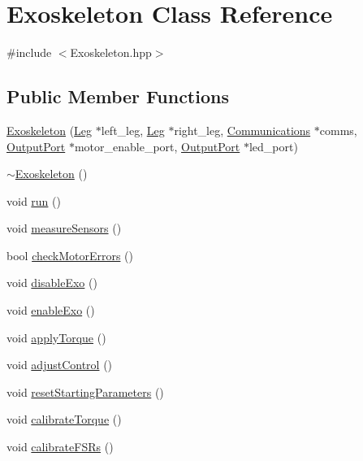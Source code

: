 \hypertarget{classExoskeleton}{}\section{Exoskeleton Class Reference}
\label{classExoskeleton}


{\ttfamily \#include $<$Exoskeleton.\+hpp$>$}

\subsection*{Public Member Functions}
\begin{DoxyCompactItemize}
\item 
\hyperlink{classExoskeleton_ad8715617b3ba37cb31cbfa9679ec658f}{Exoskeleton} (\hyperlink{classLeg}{Leg} $\ast$left\+\_\+leg, \hyperlink{classLeg}{Leg} $\ast$right\+\_\+leg, \hyperlink{classCommunications}{Communications} $\ast$comms, \hyperlink{classOutputPort}{Output\+Port} $\ast$motor\+\_\+enable\+\_\+port, \hyperlink{classOutputPort}{Output\+Port} $\ast$led\+\_\+port)
\item 
\hyperlink{classExoskeleton_ae1c57b8f0c73de1ba90b0032d322a22e}{$\sim$\+Exoskeleton} ()
\item 
void \hyperlink{classExoskeleton_ac72f30ed64b121a89f546e542d3f4b70}{run} ()
\item 
void \hyperlink{classExoskeleton_a5c4a24e482efc10effd32ef3ae318843}{measure\+Sensors} ()
\item 
bool \hyperlink{classExoskeleton_af6caca71956f565f8c8f11f14b74ab48}{check\+Motor\+Errors} ()
\item 
void \hyperlink{classExoskeleton_af5a56800ab2bb98eae7e14470f4e91e0}{disable\+Exo} ()
\item 
void \hyperlink{classExoskeleton_a562adb009a9eb74d0b3197ff191561f2}{enable\+Exo} ()
\item 
void \hyperlink{classExoskeleton_a861d90cb9820ab25926391ad2c0a1509}{apply\+Torque} ()
\item 
void \hyperlink{classExoskeleton_a64f19c7f0a676342f12fbc000efce386}{adjust\+Control} ()
\item 
void \hyperlink{classExoskeleton_aae87818791c933e46ad9b991f5f54a31}{reset\+Starting\+Parameters} ()
\item 
void \hyperlink{classExoskeleton_a9af6d42deae939186da16188080f1bb4}{calibrate\+Torque} ()
\item 
void \hyperlink{classExoskeleton_a16374a659b52484ffd0b025778a0c1bb}{calibrate\+F\+S\+Rs} ()
\item 

\end{DoxyCompactItemize}
